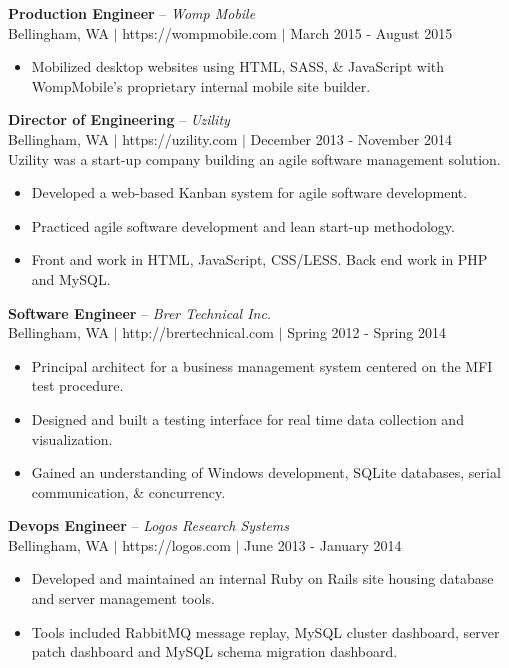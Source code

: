 \documentclass[line,margin]{res}
\begin{document}
\begin{resume}
    {\bf Production Engineer} -- {\sl Womp Mobile} \\
    {\footnotesize Bellingham, WA $|$ https://wompmobile.com $|$ March 2015 - August 2015}
    \begin{itemize} \itemsep -2pt
        \item Mobilized desktop websites using HTML, SASS, \& JavaScript with WompMobile's proprietary internal mobile site builder.
    \end{itemize}

    {\bf Director of Engineering} -- {\sl Uzility} \\
    {\footnotesize Bellingham, WA $|$ https://uzility.com $|$ December 2013 - November 2014} \\
    Uzility was a start-up company building an agile software management solution.
    \begin{itemize}  \itemsep -2pt
        \item Developed a web-based Kanban system for agile software development.
        \item Practiced agile software development and lean start-up methodology.
        \item Front and work in HTML, JavaScript, CSS/LESS. Back end work in PHP and MySQL.
    \end{itemize}

    {\bf Software Engineer} -- {\sl Brer Technical Inc.} \\
    {\footnotesize Bellingham, WA $|$ http://brertechnical.com $|$ Spring 2012 - Spring 2014}
    \begin{itemize} \itemsep -2pt
        \item Principal architect for a business management system centered on the MFI test procedure.
        \item Designed and built a testing interface for real time data collection and visualization.
        \item Gained an understanding of Windows development, SQLite databases, serial communication, \& concurrency.
    \end{itemize}

    {\bf Devops Engineer} -- {\sl Logos Research Systems} \\
    {\footnotesize Bellingham, WA $|$ https://logos.com $|$ June 2013 - January 2014}
    \begin{itemize} \itemsep -2pt
        \item Developed and maintained an internal Ruby on Rails site housing database and server management tools.
        \item Tools included RabbitMQ message replay, MySQL cluster dashboard, server patch dashboard and MySQL schema migration dashboard.
    \end{itemize}


\end{resume}
\end{document}
